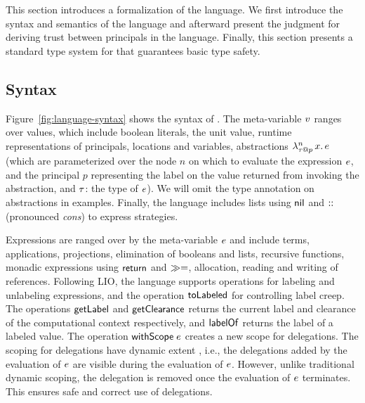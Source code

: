 This section introduces a formalization of the \lang{} language. We first introduce the syntax and semantics of the language and afterward present the judgment for deriving trust between principals in the language. Finally, this section presents a standard type system for \lang that guarantees basic type safety.

\subsection{Syntax}
Figure~\ref{fig:language-syntax} shows the syntax of \lang. The meta-variable $v$ ranges over values, which include boolean literals, the unit value, runtime representations of principals, locations and variables, abstractions $\lambda^{n}_{\tau \mathbin{@} p}\,x.\,e$ (which are parameterized over the node $n$ on which to evaluate the expression $e$, and the principal $p$ representing the label on the value returned from invoking the abstraction, and $\tau$: the type of $e$). We will omit the type annotation on abstractions in examples. Finally, the language includes lists using $\mathsf{nil}$ and $\mathbin{::}$ (pronounced \emph{cons}) to express strategies.

Expressions are ranged over by the meta-variable $e$ and include terms, applications, projections, elimination of booleans and lists, recursive functions, monadic expressions using $\mathsf{return}$ and $\gg=$, allocation, reading and writing of references. Following LIO, the language supports operations for labeling and unlabeling expressions, and the operation $\mathsf{toLabeled}$ for controlling label creep. The operations $\mathsf{getLabel}$ and $\mathsf{getClearance}$ returns the current label and clearance of the computational context respectively, and $\mathsf{labelOf}$ returns the label of a labeled value.
The operation $\mathsf{withScope}\;e$ creates a new scope for delegations. The scoping for delegations have dynamic extent \cite{Moore:2016:EAC:2983990.2984021}, i.e., the delegations added by the evaluation of $e$ are visible during the evaluation of $e$. However, unlike traditional dynamic scoping, the delegation is removed once the evaluation of $e$ terminates. This ensures safe and correct use of delegations.

